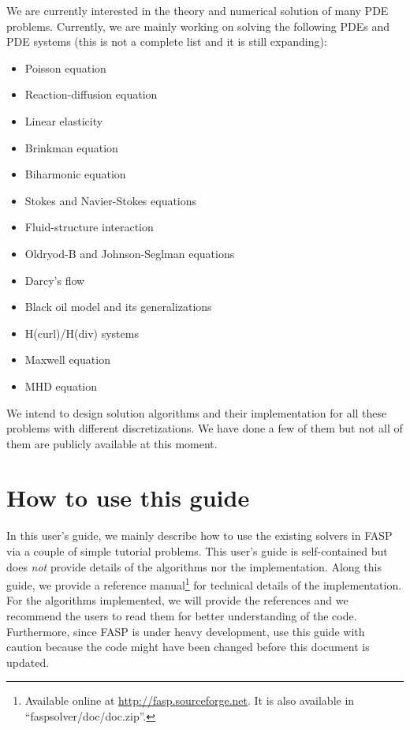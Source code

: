 \documentclass[11pt]{memoir}
\begin{document}
We are currently interested in the theory and numerical solution of many PDE problems. Currently, we are mainly working on solving the following PDEs and PDE systems (this is not a complete list and it is still expanding):
\begin{itemize}
\item Poisson equation
\item Reaction-diffusion equation
\item Linear elasticity
\item Brinkman equation
\item Biharmonic equation
\item Stokes and Navier-Stokes equations
\item Fluid-structure interaction
\item Oldryod-B and Johnson-Seglman equations
\item Darcy's flow
\item Black oil model and its generalizations
\item H(curl)/H(div) systems
\item Maxwell equation
\item MHD equation
\end{itemize}
%
We intend to design solution algorithms and their implementation for all these problems with different discretizations. We have done a few of them but not all of them are publicly available at this moment.


\section{How to use this guide}\label{sec:how}

In this user's guide, we mainly describe how to use the existing solvers in FASP via a couple of simple tutorial problems. This user's guide is self-contained but does \emph{not} provide details of the algorithms nor the implementation. Along this guide, we provide a reference manual\footnote{Available online at \url{http://fasp.sourceforge.net}. It is also available in ``faspsolver/doc/doc.zip''.} for technical details of the implementation. For the algorithms implemented, we will provide the references and we recommend the users to read them for better understanding of the code. Furthermore, since FASP is under heavy development, use this guide with caution because the code might have been changed before this document is updated.


\end{document}
